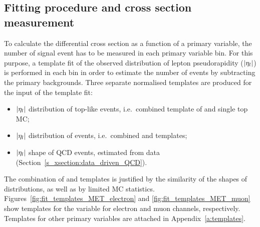 \subsection{Fitting procedure and cross section measurement}
\label{ss_xsection:fitting}
To calculate the differential cross section as a function of a primary variable, the number of signal \ttbar event has
to be measured in each primary variable bin. For this purpose, a template fit of the observed distribution of lepton
pseudorapidity ($\lvert \eta_l \rvert$) is performed in each bin in order to estimate the number of \ttbar events by
subtracting the primary backgrounds. Three separate normalised templates are produced for the input of the template fit:

\begin{itemize}
	\item $\lvert \eta_l \rvert$ distribution of top-like events, i.e.\ combined template of \ttbar and single top MC;
	\item $\lvert \eta_l \rvert$ distribution of \VpJets events, i.e.\ combined \WpJets and \ZpJets templates;
	\item $\lvert \eta_l \rvert$ shape of QCD events, estimated from data (Section~\ref{s_xsection:data_driven_QCD}).
\end{itemize}

The combination of \WpJets and \ZpJets templates is justified by the similarity of the shapes of distributions, as well
as by limited MC statistics. Figures~\ref{fig:fit_templates_MET_electron} and \ref{fig:fit_templates_MET_muon} show
templates for the \MET variable for electron and muon channels, respectively. Templates for other primary variables are
attached in Appendix~\ref{a:templates}.


